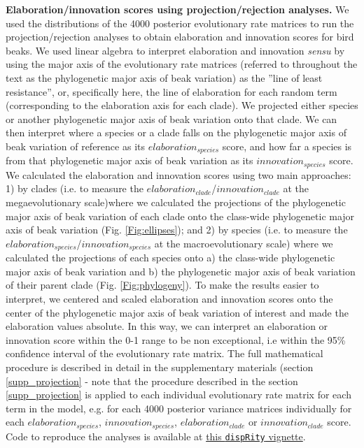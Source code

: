 \documentclass[12pt,letterpaper]{article}
\begin{document}
\textbf{Elaboration/innovation scores using projection/rejection analyses.} We used the distributions of the 4000 posterior evolutionary rate matrices to run the projection/rejection analyses to obtain elaboration and innovation scores for bird beaks.
We used linear algebra to interpret elaboration and innovation \textit{sensu} \cite{endler2005animal} by using the major axis of the evolutionary rate matrices (referred to throughout the text as the phylogenetic major axis of beak variation) as the ''line of least resistance'', or, specifically here, the line of elaboration for each random term (corresponding to the elaboration axis for each clade).
We projected either species or another phylogenetic major axis of beak variation onto that clade.
We can then interpret where a species or a clade falls on the phylogenetic major axis of beak variation of reference as its $elaboration_{species}$ score, and how far a species is from that phylogenetic major axis of beak variation as its $innovation_{species}$ score.
We calculated the elaboration and innovation scores using two main approaches: 1) by clades (i.e.
to measure the $elaboration_{clade}$/$innovation_{clade}$ at the megaevolutionary scale)where we calculated the projections of the phylogenetic major axis of beak variation of each clade onto the class-wide phylogenetic major axis of beak variation (Fig. \ref{Fig:ellipses}); and 2) by species (i.e.
to measure the $elaboration_{species}$/$innovation_{species}$ at the macroevolutionary scale) where we calculated the projections of each species onto a) the class-wide phylogenetic major axis of beak variation and b) the phylogenetic major axis of beak variation of their parent clade (Fig. \ref{Fig:phylogeny}).
To make the results easier to interpret, we centered and scaled elaboration and innovation scores onto the center of the phylogenetic major axis of beak variation of interest and made the elaboration values absolute.
In this way, we can interpret an elaboration or innovation score within the 0-1 range to be non exceptional, i.e within the 95\% confidence interval of the evolutionary rate matrix.
The full mathematical procedure is described in detail in the supplementary materials (section \ref{supp_projection} - note that the procedure described in the section \ref{supp_projection} is applied to each individual evolutionary rate matrix for each term in the model, e.g. for each 4000 posterior variance matrices individually for each $elaboration_{species}$, $innovation_{species}$, $elaboration_{clade}$ or $innovation_{clade}$ score. %
Code to reproduce the analyses is available at \href{https://raw.rawgit.net/TGuillerme/dispRity/master/inst/vignettes/Projection_analysis.html}{this \texttt{dispRity} vignette}.
\end{document}
